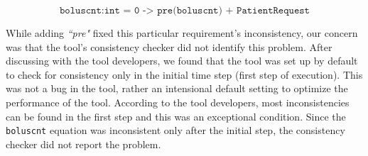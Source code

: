 $$ \texttt{boluscnt:int = 0 -> pre(boluscnt) + PatientRequest} $$

While adding \emph{``pre"} fixed this particular requirement's inconsistency, our concern was that the tool's consistency checker did not identify this problem. After discussing with the tool developers, we found that the tool was set up by default to check for consistency only in the initial time step (first step of execution). This was not a bug in the tool, rather an intensional default setting to optimize the performance of the tool. According to the tool developers, most inconsistencies can be found in the first step and this was an exceptional condition. Since the \texttt{boluscnt} equation was inconsistent only after the initial step, the consistency checker did not report the problem.


%
%

